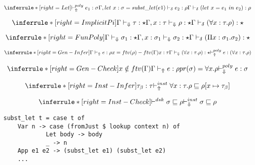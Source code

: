 \[
\inferrule*[right=Let]
{\polyinfer e_1 : \sigma \\ \Gamma, let\ x:\sigma = subst\_let(e1) \infercheckno e_2: \rho}
{\infercheck ( let\ x = e_1\ in\ e_2 ) : \rho }
\]

\framebox{$ \judge \sigma : \star$ }

\[
\inferrule*[right=ImplicitPi]
{\checktype \tau : \star \\ \Gamma, x:\tau \checktypeno \rho : \star} {\infercheck (\forall x : \tau. \rho) : \star}
\]

\framebox{$ \judge \rho : \star$ }

\[
\inferrule*[right=FunPoly]
{\checktype \sigma_1 : \star \\ \Gamma, x:\sigma_1 \checktypeno \sigma_2 : \star} {\infercheck (\Pi x : \sigma_1. \sigma_2) : \star}
\]

\framebox{$ \Gamma \polyinfercheck \tau : \sigma$ }

\[
\inferrule*[right=Gen-Infer]
{\infertype e :\rho \\ x=ftv(\rho)-ftv(\Gamma) \\ x:\tau \\ \checktype (\forall x:\tau. \rho):\star } {\polyinfer e :(\forall x:\tau. \rho)}
\]

\[
\inferrule*[right=Gen-Check]
{x \notin ftv(\Gamma) \\ \infertype e :\rho \\ pr(\sigma) = \forall x. \rho} {\polycheck e : \sigma}
\]

\framebox{$ \instinfercheck \sigma \sqsubseteq \rho$ }

\[
\inferrule*[right=Inst-Infer]
{\tau_\beta : \tau}
{\instinfer \forall x:\tau. \rho \sqsubseteq \rho[x \mapsto \tau_\beta]}
\]

\[
\inferrule*[right=Inst-Check]
{\polymorphic \sigma \sqsubseteq \rho } {\instcheck \sigma \sqsubseteq \rho}
\]





\begin{lstlisting}
subst_let t = case t of
    Var n -> case (fromJust $ lookup context n) of
            Let body -> body
            _ -> n
    App e1 e2 -> (subst_let e1) (subst_let e2)
    ...
\end{lstlisting}

